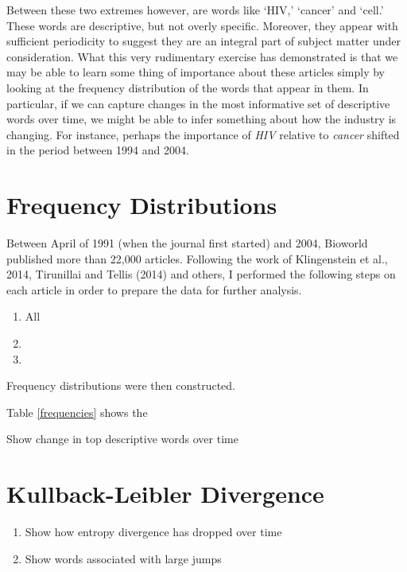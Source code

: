 Between these two extremes however, are words like `HIV,' `cancer' and `cell.' These words are descriptive, but not overly specific. Moreover, they appear with sufficient periodicity to suggest they are an integral part of subject matter under consideration. What this very rudimentary exercise has demonstrated is that we may be able to learn some thing of importance about these articles simply by looking at the frequency distribution of the words that appear in them. In particular, if we can capture changes in the most informative set of descriptive words over time, we might be able to infer something about how the industry is changing. For instance, perhaps the importance of \emph{HIV} relative to \emph{cancer} shifted in the period between 1994 and 2004.

\section{Frequency Distributions}

Between April of 1991 (when the journal first started) and 2004, Bioworld published more than 22,000 articles. Following the work of Klingenstein et al., 2014, Tirunillai and Tellis (2014) and others, I performed the following steps on each article in order to prepare the data for further analysis.
\begin{enumerate}
  \item All 
  \item 
  \item 
\end{enumerate}


Frequency distributions were then constructed. 

Table \ref{frequencies} shows the 

Show change in top descriptive words over time

\section{Kullback-Leibler Divergence}

\begin{enumerate}
  \item Show how entropy divergence has dropped over time
  \item Show words associated with large jumps
\end{enumerate}


